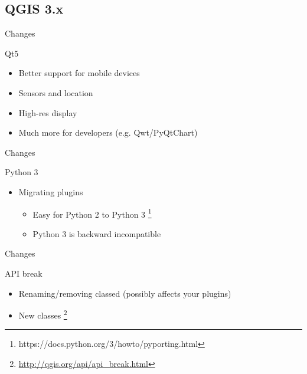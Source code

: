\subsection{QGIS 3.x}
\begin{frame}{Changes}
	\begin{block}{Qt5}
		\begin{itemize}
			\item Better support for mobile devices
			\item Sensors and location
			\item High-res display
			\item Much more for developers (e.g. Qwt/PyQtChart)
		\end{itemize}
	\end{block}
\end{frame}

\begin{frame}{Changes}
	\begin{block}{Python 3}
		\begin{itemize}
			\item Migrating plugins
			\begin{itemize}
				\item Easy for Python 2 to Python 3 \footnote{https://docs.python.org/3/howto/pyporting.html}
				\item Python 3 is backward incompatible
			\end{itemize}
		\end{itemize}
	\end{block}
\end{frame}

\begin{frame}{Changes}
	\begin{block}{API break}
		\begin{itemize}
			\item Renaming/removing classed (possibly affects your plugins)
			\item New classes \footnote{\href{http://qgis.org/api/api_break.html}{http://qgis.org/api/api\_break.html}}
		\end{itemize}
	\end{block}
\end{frame}

